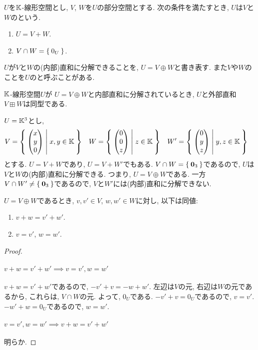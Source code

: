 \begin{definition}
  $U$を$\mathbb{K}$-線形空間とし,
  $V$, $W$を$U$の部分空間とする.
  次の条件を満たすとき,
  $U$は$V$と$W$のという.
  \begin{enumerate}
  \item $U=V+W$.
  \item $V\cap W=\Set{0_U}$.
  \end{enumerate}
  $U$が$V$と$W$の(内部)直和に分解できることを,
  $U=V\oplus W$と書き表す.
  また$V$や$W$のことを$U$のと呼ぶことがある.
\end{definition}
\begin{remark}
$\mathbb{K}$-線形空間$U$が
  $U=V\oplus W$と内部直和に分解されているとき,
  $U$と外部直和$V\boxplus W$は同型である.
\end{remark}
\begin{example}
  $U=\mathbb{K}^3$とし,
  \begin{align*}
    V&=\Set{\begin{pmatrix}x\\y\\0\end{pmatrix}|x,y\in\mathbb{K}}&
    W&=\Set{\begin{pmatrix}0\\0\\z\end{pmatrix}|z\in\mathbb{K}}&
    W'&=\Set{\begin{pmatrix}0\\y\\z\end{pmatrix}|y,z\in\mathbb{K}}
  \end{align*}
  とする.
  $U=V+W$であり, $U=V+W'$でもある.
  $V\cap W=\Set{\boldsymbol{0}_3}$であるので,
  $U$は$V$と$W$の(内部)直和に分解できる.
  つまり, $U=V\oplus W$である.
  一方$V\cap W'\neq \Set{\boldsymbol{0}_3}$であるので,
  $V$と$W'$には(内部)直和に分解できない.
\end{example}

\begin{prop}
  $U=V\oplus W$であるとき,
  $v,v'\in V$,
  $w,w'\in W$に対し, 以下は同値:
  \begin{enumerate}
  \item $v\plus w=v'\plus w'$.
  \item $v=v'$, $w=w'$.
  \end{enumerate}
\end{prop}
\begin{proof}
  \paragraph{$v\plus w=v'\plus w'\implies v=v', w=w'$}
  $v\plus w=v'\plus w'$であるので,
  $-v'\plus v=-w\plus w'$.
  左辺は$V$の元, 右辺は$W$の元であるから,
  これらは, $V\cap W$の元.
  よって, $0_U$である.
  $-v'\plus v=0_U$であるので, $v=v'$.
  $-w'\plus w=0_U$であるので, $w=w'$.
  
  \paragraph{$v=v', w=w'\implies v\plus w=v'\plus w'$}
  明らか.
\end{proof}


